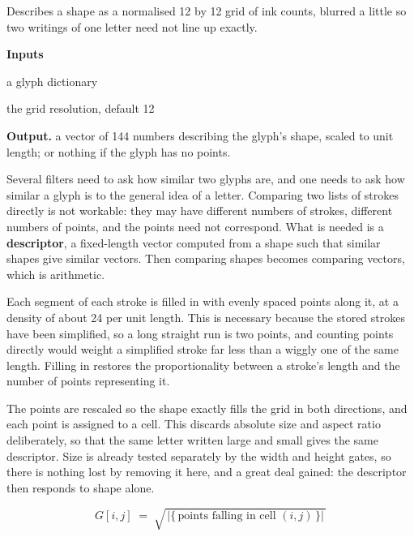 Describes a shape as a normalised 12 by 12 grid of ink counts, blurred a little so two writings of one letter need not line up exactly.




\noindent\textbf{Inputs}
\begin{description}[leftmargin=2.2em,style=nextline,font=\normalfont\ttfamily]\setlength\itemsep{1pt}
  \item[{g}] \normalfont a glyph dictionary
  \item[{n}] \normalfont the grid resolution, default 12
\end{description}

\noindent\textbf{Output.} a vector of 144 numbers describing the glyph's shape, scaled to unit length; or nothing if the glyph has no points.


Several filters need to ask how similar two glyphs are, and one needs to ask how similar a glyph is to the general idea of a letter. Comparing two lists of strokes directly is not workable: they may have different numbers of strokes, different numbers of points, and the points need not correspond. What is needed is a \textbf{descriptor}, a fixed-length vector computed from a shape such that similar shapes give similar vectors. Then comparing shapes becomes comparing vectors, which is arithmetic.


Each segment of each stroke is filled in with evenly spaced points along it, at a density of about 24 per unit length. This is necessary because the stored strokes have been simplified, so a long straight run is two points, and counting points directly would weight a simplified stroke far less than a wiggly one of the same length. Filling in restores the proportionality between a stroke's length and the number of points representing it.


The points are rescaled so the shape exactly fills the grid in both directions, and each point is assigned to a cell. This discards absolute size and aspect ratio deliberately, so that the same letter written large and small gives the same descriptor. Size is already tested separately by the width and height gates, so there is nothing lost by removing it here, and a great deal gained: the descriptor then responds to shape alone.



\begin{equation}
G[i,j] \;=\; \sqrt{\,\big|\{\,\text{points falling in cell } (i,j)\,\}\big|\,}
\end{equation}

